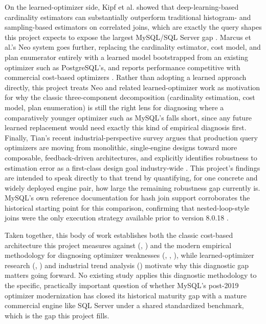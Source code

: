 \documentclass[conference]{IEEEtran}
\begin{document}
On the learned-optimizer side, Kipf et al. showed that deep-learning-based cardinality estimators can substantially outperform traditional histogram- and sampling-based estimators on correlated joins, which are exactly the query shapes this project expects to expose the largest MySQL/SQL Server gap \cite{kipf2018}. Marcus et al.'s Neo system goes further, replacing the cardinality estimator, cost model, and plan enumerator entirely with a learned model bootstrapped from an existing optimizer such as PostgreSQL's, and reports performance competitive with commercial cost-based optimizers \cite{marcus2019}. Rather than adopting a learned approach directly, this project treats Neo and related learned-optimizer work as motivation for why the classic three-component decomposition (cardinality estimation, cost model, plan enumeration) is still the right lens for diagnosing where a comparatively younger optimizer such as MySQL's falls short, since any future learned replacement would need exactly this kind of empirical diagnosis first. Finally, Tian's recent industrial-perspective survey argues that production query optimizers are moving from monolithic, single-engine designs toward more composable, feedback-driven architectures, and explicitly identifies robustness to estimation error as a first-class design goal industry-wide \cite{tian2025}. This project's findings are intended to speak directly to that trend by quantifying, for one concrete and widely deployed engine pair, how large the remaining robustness gap currently is. MySQL's own reference documentation for hash join support corroborates the historical starting point for this comparison, confirming that nested-loop-style joins were the only execution strategy available prior to version 8.0.18 \cite{mysqlhashjoin}.

Taken together, this body of work establishes both the classic cost-based architecture this project measures against (\cite{selinger1979}, \cite{chaudhuri1998}) and the modern empirical methodology for diagnosing optimizer weaknesses (\cite{leis2015}, \cite{leis2025}, \cite{lee2023}), while learned-optimizer research (\cite{kipf2018}, \cite{marcus2019}) and industrial trend analysis (\cite{tian2025}) motivate why this diagnostic gap matters going forward. No existing study applies this diagnostic methodology to the specific, practically important question of whether MySQL's post-2019 optimizer modernization has closed its historical maturity gap with a mature commercial engine like SQL Server under a shared standardized benchmark, which is the gap this project fills.
\end{document}
